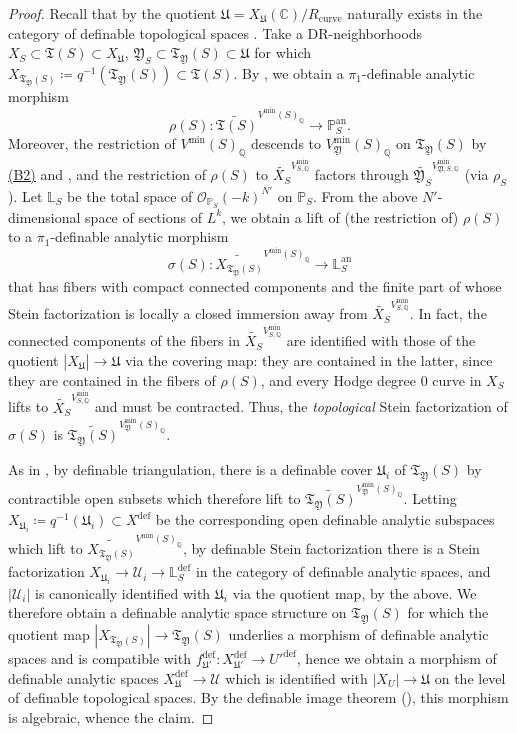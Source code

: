 \documentclass{amsart}
\newcommand{\customref}[2]{\hyperref[#1]{#2}}
\newcommand{\an}{\operatorname{an}}
\def\bL#1.{\mathbf{L}_{#1}}
\theoremstyle{definition}
\theoremstyle{remark}
\def\bQ{\mathbb{Q}}
\def\bC{\mathbb{C}}
\def\bP{\mathbb{P}}
\def\bL{\mathbb{L}}
\def\cO{\mathcal{O}}
\def\cU{\mathcal{U}}
\def\fT{\mathfrak{T}}
\def\define{\mathrm{def}}
\def\an{\mathrm{an}}
\def\mini{\mathrm{min}}
\def\curve{\mathrm{curve}}
\def\fT{\mathfrak{T}}
\def\fY{\mathfrak{Y}}
\def\fU{\mathfrak{U}}
\numberwithin{equation}{section}
\begin{document}
\begin{proof}
Recall that by  the quotient $\fU=X_{\fU}(\bC)/R_\curve$ naturally exists in the category of definable topological spaces \cite[Chap. 10, (2.15) Theorem]{Dries}.  Take a DR-neighborhoods  $X_S\subset \fT(S)\subset X_\fU$, $\fY_S\subset \fT_\fY(S)\subset\fU$ for which $X_{\fT_\fY(S)}\coloneqq  q^{-1}(\fT_\fY(S))\subset \fT(S)$.  By , we obtain a $\pi_1$-definable analytic morphism $$\rho(S):\widetilde{\fT(S)}^{V^\mini(S)_{\bQ}}\to \bP^{\an}_S.$$  Moreover, the restriction of $V^\mini(S)_\bQ$ descends to $V^\mini_{\fY}(S)_\bQ$ on $\fT_{\fY}(S)$ by \customref{b2}{(B2)} and , and the restriction of $\rho(S)$ to $\widetilde{X_S}^{V^\mini_{S,\bQ}}$ factors through $\widetilde{\fY_S}^{V^\mini_{\fY,S,\bQ}}$ (via $\rho_S$).
Let $\bL_S$ be the total space of $\cO_{\bP_S}(-k)^{N'}$ on $\bP_S$.  From the above $N'$-dimensional space of sections of $L^k$, we obtain a lift of (the restriction of) $\rho(S)$ to a $\pi_1$-definable analytic morphism $$\sigma(S):\widetilde{X_{\fT_\fY(S)}}^{V^\mini(S)_{\bQ}}\to \bL_S^\an$$
that has fibers with compact connected components and the finite part of whose Stein factorization is locally a closed immersion away from $\widetilde{X_S}^{V^\mini_{S,\bQ}}$.  In fact, the connected components of the fibers in $\widetilde{X_S}^{V^\mini_{S,\bQ}}$ are identified with those of the quotient $|X_\fU|\to\fU$ via the covering map: they are contained in the latter, since they are contained in the fibers of $\rho(S)$, and every Hodge degree 0 curve in $X_S$ lifts to $\widetilde{X_S}^{V^\mini_{S,\bQ}}$ and must be contracted.  Thus, the \emph{topological} Stein factorization of $\sigma(S)$ is $\widetilde{\fT_{\fY}(S)}^{V^\mini_{\fY}(S)_{\bQ}}$.

\def\fW{\mathfrak{W}}
As in \cite{BBTshaf}, by definable triangulation, there is a definable cover $\fU_i$ of $\fT_{\fY}(S)$ by contractible open subsets which therefore lift to $\widetilde{\fT_{\fY}(S)}^{V^\mini_{\fY}(S)_{\bQ}}$.  Letting $X_{\fU_i}\coloneqq  q^{-1}(\fU_i)\subset X^{\define}$ be the corresponding open definable analytic subspaces which lift to $\widetilde{X_{\fT_\fY(S)}}^{V^\mini(S)_{\bQ}}$, by definable Stein factorization \cite[Theorem 1.7]{BBTshaf} there is a Stein factorization $X_{\fU_i}\to \cU_i\to \bL_S^\define$ in the category of definable analytic spaces, and $|\cU_i|$ is canonically identified with $\fU_i$ via the quotient map, by the above.  We therefore obtain a definable analytic space structure on $\fT_{\fY}(S)$ for which the quotient map $|X_{\fT_\fY(S)}|\to \fT_{\fY}(S)$ underlies a morphism of definable analytic spaces and is compatible with $f_{\fU'}^\define :X_{\fU'}^\define \to U'^\define$, hence we obtain a morphism of definable analytic spaces $X_\fU^\define \to \cU$ which is identified with $|X_U|\to \fU$ on the level of definable topological spaces.  By the definable image theorem (), this morphism is algebraic, whence the claim.
\end{proof}
\end{document}
